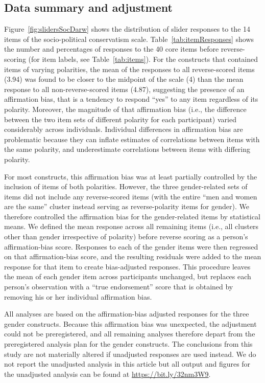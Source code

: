 \documentclass[fignum,man]{apa}\usepackage[]{graphicx}\usepackage[]{color}
\begin{document}
\subsection{Data summary and adjustment}
Figure~\ref{fig:slidersSocDarw} shows the distribution
of slider responses to the 14 items of the socio-political conservatism scale.
Table~\ref{tab:itemResponses}
shows the number and percentages of responses to the 40 core
items before
reverse-scoring (for item labels, see Table~\ref{tab:items}).
For the constructs that contained items of varying polarities,
the mean of the responses to all reverse-scored items (3.94)
was found to be 
closer to the midpoint of the scale (4) than the mean response to all non-reverse-scored
items (4.87), suggesting the presence of an
affirmation bias, that is a tendency to respond ``yes'' to any item regardless of
its polarity. Moreover, the magnitude of that affirmation bias (i.e., the difference 
between the two item sets of different polarity for each participant) varied
considerably across individuals. Individual differences in 
affirmation bias are problematic because they can inflate estimates
of correlations between items with the same polarity, and 
underestimate correlations between items with differing polarity.

For most constructs, this affirmation bias was at least partially controlled
by the inclusion of items of both polarities. However, the three gender-related sets 
of items did not include any reverse-scored items (with the entire ``men and women are the same''
cluster instead serving as reverse-polarity items for gender). 
We therefore
controlled the affirmation
bias for the gender-related items by statistical means.
We defined the mean response across all remaining items (i.e., all clusters other than
gender irrespective of polarity) before reverse scoring
as a person's affirmation-bias score. 
Responses to each of the gender items were then regressed
on that affirmation-bias score, and the resulting residuals were added
to the mean response for that item to create bias-adjusted responses. 
This procedure leaves the mean of each gender item across participants unchanged,
but replaces each person's observation with a ``true endorsement'' score that
is obtained by removing his or her individual affirmation bias.

All
analyses are based on the affirmation-bias adjusted responses for the three 
gender constructs.
Because this affirmation bias was unexpected, the
adjustment could not be preregistered, and all remaining analyses
therefore depart from the preregistered analysis plan for the gender
constructs. The conclusions from this study are not materially altered if 
unadjusted responses are used instead. We do not report the 
unadjusted analysis in this article but all output and figures for the unadjusted
analysis can be found at \url{https://bit.ly/32nm3W9}.
\end{document}
